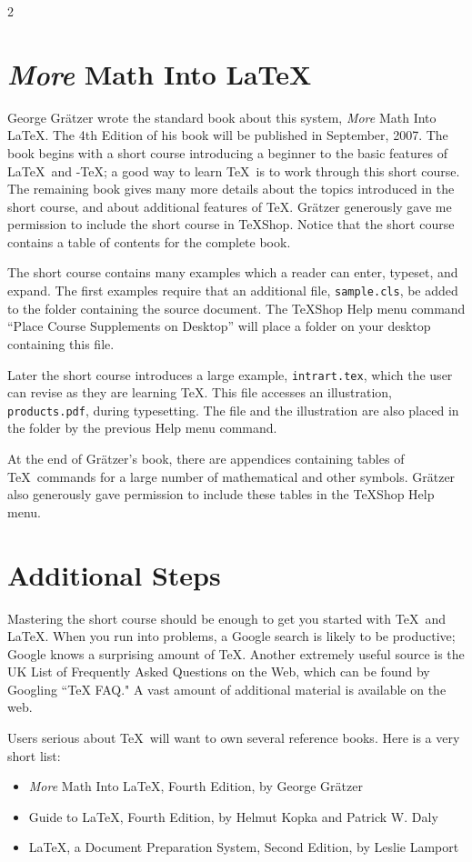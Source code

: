 \documentclass[11pt, oneside]{amsart}
\begin{document}
\begin{multicols}{2}
\section{\emph{More} Math Into \LaTeX}

George Gr\"atzer wrote the standard book about this system, \emph{More} Math Into \LaTeX.  The 4th Edition of his book will be published in September, 2007. The book begins with a  short course introducing a beginner to the basic features of \LaTeX\ and \AmS-\TeX; a good way to learn \TeX\ is to work through this short course. The remaining book gives many more details about the topics introduced in the short course, and about additional features of \TeX. Gr\"atzer generously gave me permission to include the short course in TeXShop. Notice that the short course contains a table of contents for the complete book.

The short course contains many examples which a reader can enter, typeset, and expand. The first examples require that an additional file, {\tt sample.cls}, be added to the folder containing the source document. The TeXShop Help menu command ``Place Course Supplements on Desktop'' will place a folder on your desktop containing this file.

Later the short course introduces a large example, {\tt intrart.tex}, which the user can revise as they are learning \TeX. This file accesses an illustration, {\tt products.pdf}, during typesetting. The file and the illustration are also placed in the folder by the previous Help menu command.

At the end of Gr\"atzer's book, there are appendices containing tables of \TeX\ commands for a large number of mathematical and other symbols. Gr\"atzer also generously gave permission to include these tables in the TeXShop Help menu.

\section{Additional Steps}

Mastering the short course should be enough to get you started with \TeX\ and \LaTeX. When you run into problems, a Google search is likely to be productive; Google knows a surprising amount of \TeX. Another extremely useful source  is the UK List of Frequently Asked Questions on the Web, which can be found by Googling ``TeX FAQ." A vast amount of additional material is available on the web. 

Users serious about \TeX\ will want to own several reference books. Here is a very short list:
\begin{itemize}
\item
\emph{More} Math Into \LaTeX, Fourth Edition, by George Gr\"atzer
\item Guide to \LaTeX, Fourth Edition, by Helmut Kopka and Patrick W. Daly
\item \LaTeX, a Document Preparation System, Second Edition, by Leslie Lamport
\end{itemize}


\end{multicols}
\end{document}
